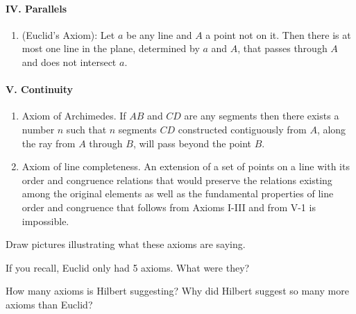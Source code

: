 \documentclass{ximera}
\begin{document}
\paragraph{IV. Parallels}

\begin{enumerate}

\item (Euclid's Axiom): Let $a$ be any line and $A$ a point not on
  it. Then there is at most one line in the plane, determined by $a$ and
  $A$, that passes through $A$ and does not intersect $a$.
\end{enumerate}

\paragraph{V. Continuity}

\begin{enumerate}
\item Axiom of Archimedes. If $AB$ and $CD$ are any segments then there
  exists a number $n$ such that $n$ segments $CD$ constructed contiguously
  from $A$, along the ray from $A$ through $B$, will pass beyond the point
  $B$.

\item Axiom of line completeness. An extension of a set of points on a
  line with its order and congruence relations that would preserve the
  relations existing among the original elements as well as the
  fundamental properties of line order and congruence that follows
  from Axioms I-III and from V-1 is impossible.
\end{enumerate}


\begin{exploration}
Draw pictures illustrating what these axioms are saying.
\end{exploration}


\begin{question}
If you recall, Euclid only had 5 axioms. What were they?
\end{question}

\begin{question}
How many axioms is Hilbert suggesting? Why did Hilbert suggest so many more axioms than Euclid? 
\end{question}
\end{document}
